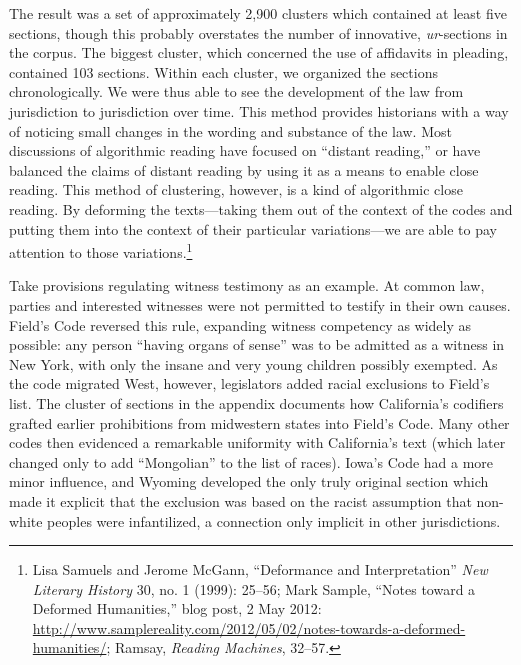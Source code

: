 \documentclass[12pt,]{article}
\let\rmarkdownfootnote\footnote%
\def\footnote{\protect\rmarkdownfootnote}
\begin{document}
The result was a set of approximately 2,900 clusters which contained at
least five sections, though this probably overstates the number of
innovative, \emph{ur}-sections in the corpus. The biggest cluster, which
concerned the use of affidavits in pleading, contained 103 sections.
Within each cluster, we organized the sections chronologically. We were
thus able to see the development of the law from jurisdiction to
jurisdiction over time. This method provides historians with a way of
noticing small changes in the wording and substance of the law. Most
discussions of algorithmic reading have focused on ``distant reading,''
or have balanced the claims of distant reading by using it as a means to
enable close reading. This method of clustering, however, is a kind of
algorithmic close reading. By deforming the texts---taking them out of
the context of the codes and putting them into the context of their
particular variations---we are able to pay attention to those
variations.\footnote{Lisa Samuels and Jerome McGann, ``Deformance and
  Interpretation'' \emph{New Literary History} 30, no. 1 (1999): 25--56;
  Mark Sample, ``Notes toward a Deformed Humanities,'' blog post, 2 May
  2012:
  \url{http://www.samplereality.com/2012/05/02/notes-towards-a-deformed-humanities/};
  Ramsay, \emph{Reading Machines}, 32--57.}

Take provisions regulating witness testimony as an example. At common
law, parties and interested witnesses were not permitted to testify in
their own causes. Field's Code reversed this rule, expanding witness
competency as widely as possible: any person ``having organs of sense''
was to be admitted as a witness in New York, with only the insane and
very young children possibly exempted. As the code migrated West,
however, legislators added racial exclusions to Field's list. The
cluster of sections in the appendix documents how California's codifiers
grafted earlier prohibitions from midwestern states into Field's Code.
Many other codes then evidenced a remarkable uniformity with
California's text (which later changed only to add ``Mongolian'' to the
list of races). Iowa's Code had a more minor influence, and Wyoming
developed the only truly original section which made it explicit that
the exclusion was based on the racist assumption that non-white peoples
were infantilized, a connection only implicit in other jurisdictions.
\end{document}
